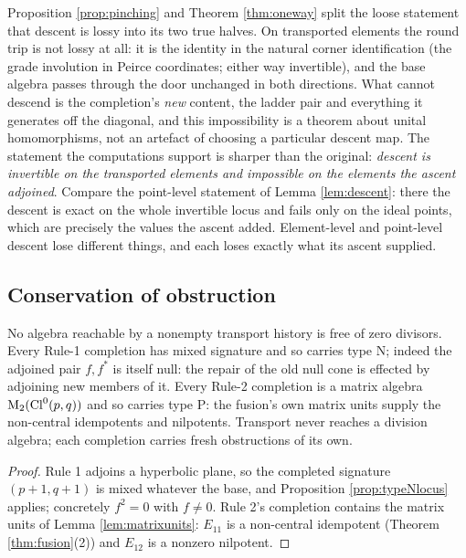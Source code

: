 \begin{remark}\label{rem:twosided}
Proposition \ref{prop:pinching} and Theorem \ref{thm:oneway} split the loose statement that descent is lossy into its two true halves. On transported elements the round trip is not lossy at all: it is the identity in the natural corner identification (the grade involution in Peirce coordinates; either way invertible), and the base algebra passes through the door unchanged in both directions. What cannot descend is the completion's \emph{new} content, the ladder pair and everything it generates off the diagonal, and this impossibility is a theorem about unital homomorphisms, not an artefact of choosing a particular descent map. The statement the computations support is sharper than the original: \emph{descent is invertible on the transported elements and impossible on the elements the ascent adjoined}. Compare the point-level statement of Lemma \ref{lem:descent}: there the descent is exact on the whole invertible locus and fails only on the ideal points, which are precisely the values the ascent added. Element-level and point-level descent lose different things, and each loses exactly what its ascent supplied.
\end{remark}

\subsection{Conservation of obstruction}\label{subsec:conservation}

\begin{proposition}\label{prop:noterminate}
No algebra reachable by a nonempty transport history is free of zero divisors. Every Rule-1 completion has mixed signature and so carries type N; indeed the adjoined pair $f, f^*$ is itself null: the repair of the old null cone is effected by adjoining new members of it. Every Rule-2 completion is a matrix algebra $\mathrm{M}_2(\mathrm{Cl}^0(p,q))$ and so carries type P: the fusion's own matrix units supply the non-central idempotents and nilpotents. Transport never reaches a division algebra; each completion carries fresh obstructions of its own.
\end{proposition}

\begin{proof}
Rule 1 adjoins a hyperbolic plane, so the completed signature $(p{+}1, q{+}1)$ is mixed whatever the base, and Proposition \ref{prop:typeNlocus} applies; concretely $f^2 = 0$ with $f \neq 0$. Rule 2's completion contains the matrix units of Lemma \ref{lem:matrixunits}: $E_{11}$ is a non-central idempotent (Theorem \ref{thm:fusion}(2)) and $E_{12}$ is a nonzero nilpotent.
\end{proof}

